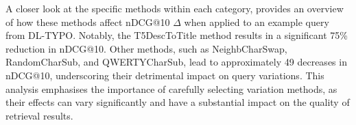 A closer look at the specific methods within each category,  provides an overview of how these methods affect nDCG@10 $\Delta$ when applied to an example query from DL-TYPO. Notably, the T5DescToTitle method results in a significant 75\% reduction in nDCG@10. Other methods, such as NeighbCharSwap, RandomCharSub, and QWERTYCharSub, lead to approximately 49 decreases in nDCG@10, underscoring their detrimental impact on query variations. This analysis emphasises the importance of carefully selecting variation methods, as their effects can vary significantly and have a substantial impact on the quality of retrieval results.



\begin{comment}
    \subsection{Robustness by Model Category}
    The study examined how different model categories responded to query variations. Models were categorised as Trad (lexical matching), NN (neural network-based), and TNN (transformer language model-based). The findings revealed that, despite varying magnitudes and directions of nDCG@10 $\Delta$ values, models within the same category exhibited similar behaviour in response to query variations. tSNE dimensionality reduction and correlation analysis indicated that each model type was affected in a manner consistent with its category. Furthermore, the analysis showed that TNN models slightly preferred natural language queries over keyword queries. The effect of word order on TNN models was minimal, in line with recent research suggesting that word order may be less critical for transformer models.
    
    \note{figure (figure 3)}
    \note{table (table 6)}
    \note{explain trends}
    \note{compare to og}
\end{comment}
